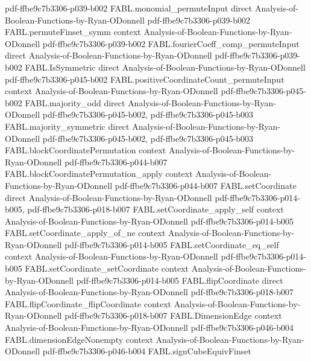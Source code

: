 \begin{theorem}
  {pdf-ffbe9c7b3306-p039-b002}
\proofstep
  {FABL.monomial_permuteInput}
  {direct}
  {Analysis-of-Boolean-Functions-by-Ryan-ODonnell}
  {pdf-ffbe9c7b3306-p039-b002}
\proofstep
  {FABL.permuteFinset_symm}
  {context}
  {Analysis-of-Boolean-Functions-by-Ryan-ODonnell}
  {pdf-ffbe9c7b3306-p039-b002}
\proofstep
  {FABL.fourierCoeff_comp_permuteInput}
  {direct}
  {Analysis-of-Boolean-Functions-by-Ryan-ODonnell}
  {pdf-ffbe9c7b3306-p039-b002}
\proofstep
  {FABL.IsSymmetric}
  {direct}
  {Analysis-of-Boolean-Functions-by-Ryan-ODonnell}
  {pdf-ffbe9c7b3306-p045-b002}
\proofstep
  {FABL.positiveCoordinateCount_permuteInput}
  {context}
  {Analysis-of-Boolean-Functions-by-Ryan-ODonnell}
  {pdf-ffbe9c7b3306-p045-b002}
\proofstep
  {FABL.majority_odd}
  {direct}
  {Analysis-of-Boolean-Functions-by-Ryan-ODonnell}
  {pdf-ffbe9c7b3306-p045-b002,
    pdf-ffbe9c7b3306-p045-b003}
\proofstep
  {FABL.majority_symmetric}
  {direct}
  {Analysis-of-Boolean-Functions-by-Ryan-ODonnell}
  {pdf-ffbe9c7b3306-p045-b002,
    pdf-ffbe9c7b3306-p045-b003}
\proofstep
  {FABL.blockCoordinatePermutation}
  {context}
  {Analysis-of-Boolean-Functions-by-Ryan-ODonnell}
  {pdf-ffbe9c7b3306-p044-b007}
\proofstep
  {FABL.blockCoordinatePermutation_apply}
  {context}
  {Analysis-of-Boolean-Functions-by-Ryan-ODonnell}
  {pdf-ffbe9c7b3306-p044-b007}
\proofstep
  {FABL.setCoordinate}
  {direct}
  {Analysis-of-Boolean-Functions-by-Ryan-ODonnell}
  {pdf-ffbe9c7b3306-p014-b005,
    pdf-ffbe9c7b3306-p018-b007}
\proofstep
  {FABL.setCoordinate_apply_self}
  {context}
  {Analysis-of-Boolean-Functions-by-Ryan-ODonnell}
  {pdf-ffbe9c7b3306-p014-b005}
\proofstep
  {FABL.setCoordinate_apply_of_ne}
  {context}
  {Analysis-of-Boolean-Functions-by-Ryan-ODonnell}
  {pdf-ffbe9c7b3306-p014-b005}
\proofstep
  {FABL.setCoordinate_eq_self}
  {context}
  {Analysis-of-Boolean-Functions-by-Ryan-ODonnell}
  {pdf-ffbe9c7b3306-p014-b005}
\proofstep
  {FABL.setCoordinate_setCoordinate}
  {context}
  {Analysis-of-Boolean-Functions-by-Ryan-ODonnell}
  {pdf-ffbe9c7b3306-p014-b005}
\proofstep
  {FABL.flipCoordinate}
  {direct}
  {Analysis-of-Boolean-Functions-by-Ryan-ODonnell}
  {pdf-ffbe9c7b3306-p018-b007}
\proofstep
  {FABL.flipCoordinate_flipCoordinate}
  {context}
  {Analysis-of-Boolean-Functions-by-Ryan-ODonnell}
  {pdf-ffbe9c7b3306-p018-b007}
\proofstep
  {FABL.DimensionEdge}
  {context}
  {Analysis-of-Boolean-Functions-by-Ryan-ODonnell}
  {pdf-ffbe9c7b3306-p046-b004}
\proofstep
  {FABL.dimensionEdgeNonempty}
  {context}
  {Analysis-of-Boolean-Functions-by-Ryan-ODonnell}
  {pdf-ffbe9c7b3306-p046-b004}
\proofstep
  {FABL.signCubeEquivFinset}

\end{theorem}
